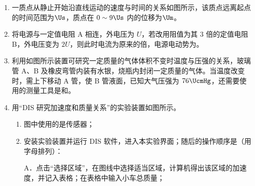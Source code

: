 \documentclass[\gkver]{gaokaozhenti}
\begin{document}
\begin{enumerate}
\item
一质点从静止开始沿直线运动的速度与时间的关系如图所示，该质点远离起点的时间范围为$\Us$，质点在 $0\sim9\Us$ 内的位移为$\Um$。
\onepicture[align=right, w=5.55cm]{}

\item
将电源与一定值电阻 A 相连，外电压为 $U$，若改用阻值为其 3 倍的定值电阻 B，外电压变为 $2U$，则此时电流为原来的倍，电源电动势为。

\item
利用如图所示装置可研究一定质量的气体体积不变时温度与压强的关系，玻璃管 A、B 及橡皮弯管内装有水银，烧瓶内封闭一定质量的气体。当温度改变时，需上下移动 A 管，使 B 管液面，已知大气压强为 $76\UcmHg$，还需要使用的测量工具是和。
\onepicture[align=right, w=4.16cm]{}

\item
用“DIS 研究加速度和质量关系”的实验装置如图所示。
\begin{enumerate}
	\item
	图中使用的是传感器；
	\item
	安装实验装置并运行 DIS 软件，进入本实验界面；随后的操作顺序是（用字母排列）：

	A．点击“选择区域”，在图线中选择适当区域，计算机得出该区域的加速度，并记入表格；在表格中输入小车总质量；


\end{enumerate}
\end{enumerate}
\end{document}
